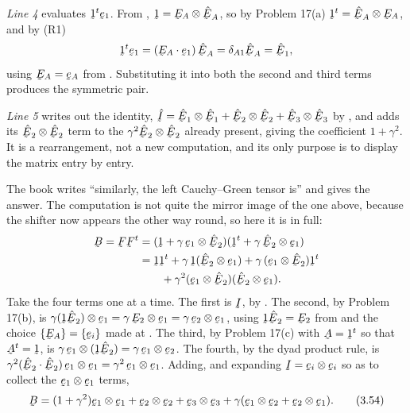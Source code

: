 \emph{Line 4} evaluates $\shift^{t}\be_{1}$. From ,
$\shift=\bE_{A}\otimes\hbE_{A}$, so by Problem 17(a)
$\shift^{t}=\hbE_{A}\otimes\bE_{A}$, and by (R1)
\[
   \shift^{t}\be_{1}=(\ip{\bE_{A}}{\be_{1}})\,\hbE_{A}
   =\dd_{A1}\hbE_{A}=\hbE_{1},
\]
using $\bE_{A}=\be_{A}$ from . Substituting it into both the
second and third terms produces the symmetric pair.

\emph{Line 5} writes out the identity, $\hI=\hbE_{1}\otimes\hbE_{1}
+\hbE_{2}\otimes\hbE_{2}+\hbE_{3}\otimes\hbE_{3}$ by , and adds its
$\hbE_{2}\otimes\hbE_{2}$ term to the $\gamma^{2}\hbE_{2}\otimes\hbE_{2}$
already present, giving the coefficient $1+\gamma^{2}$. It is a
rearrangement, not a new computation, and its only purpose is to display
the matrix  entry by entry.

The book writes ``similarly, the left Cauchy--Green tensor is'' and gives
the answer. The computation is not quite the mirror image of the one
above, because the shifter now appears the other way round, so here it is
in full:
\[
\begin{aligned}
   \bB=\bF\bF^{t}
   &=(\shift+\gamma\,\be_{1}\otimes\hbE_{2})
     (\shift^{t}+\gamma\,\hbE_{2}\otimes\be_{1})\\
   &=\shift\shift^{t}
     +\gamma\,\shift(\hbE_{2}\otimes\be_{1})
     +\gamma\,(\be_{1}\otimes\hbE_{2})\shift^{t}\\
   &\qquad+\gamma^{2}(\be_{1}\otimes\hbE_{2})(\hbE_{2}\otimes\be_{1}).
\end{aligned}
\]
Take the four terms one at a time. The first is $\I$, by . The
second, by Problem 17(b), is
$\gamma(\shift\hbE_{2})\otimes\be_{1}=\gamma\,\bE_{2}\otimes\be_{1}
=\gamma\,\be_{2}\otimes\be_{1}$, using $\shift\hbE_{2}=\bE_{2}$ from
 and the choice $\{\bE_{A}\}=\{\be_{i}\}$ made at . The
third, by Problem 17(c) with $\bA=\shift^{t}$ so that $\bA^{t}=\shift$, is
$\gamma\,\be_{1}\otimes(\shift\hbE_{2})=\gamma\,\be_{1}\otimes\be_{2}$.
The fourth, by the dyad product rule, is
$\gamma^{2}(\ip{\hbE_{2}}{\hbE_{2}})\,\be_{1}\otimes\be_{1}
=\gamma^{2}\,\be_{1}\otimes\be_{1}$. Adding, and expanding
$\I=\be_{i}\otimes\be_{i}$ so as to collect the
$\be_{1}\otimes\be_{1}$ terms,
\begin{equation}
   \bB=(1+\gamma^{2})\be_{1}\otimes\be_{1}+\be_{2}\otimes\be_{2}
      +\be_{3}\otimes\be_{3}
      +\gamma(\be_{1}\otimes\be_{2}+\be_{2}\otimes\be_{1}).
   \tag{3.54}\label{eq:3.54}
\end{equation}

